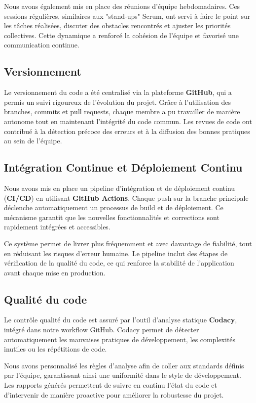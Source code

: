 \documentclass[a4paper,12pt]{article}
\begin{document}
Nous avons également mis en place des réunions d’équipe hebdomadaires. Ces sessions régulières, similaires aux "stand-ups" Scrum, ont servi à faire le point sur les tâches réalisées, discuter des obstacles rencontrés et ajuster les priorités collectives. Cette dynamique a renforcé la cohésion de l’équipe et favorisé une communication continue.

\subsection {Versionnement}

Le versionnement du code a été centralisé via la plateforme \textbf{GitHub}, qui a permis un suivi rigoureux de l’évolution du projet. Grâce à l’utilisation des branches, commits et pull requests, chaque membre a pu travailler de manière autonome tout en maintenant l'intégrité du code commun. Les revues de code ont contribué à la détection précoce des erreurs et à la diffusion des bonnes pratiques au sein de l’équipe.

\subsection{Intégration Continue et Déploiement Continu}

Nous avons mis en place un pipeline d’intégration et de déploiement continu (\textbf{CI/CD}) en utilisant \textbf{GitHub Actions}. Chaque push sur la branche principale déclenche automatiquement un processus de build et de déploiement. Ce mécanisme garantit que les nouvelles fonctionnalités et corrections sont rapidement intégrées et accessibles.

Ce système permet de livrer plus fréquemment et avec davantage de fiabilité, tout en réduisant les risques d’erreur humaine. Le pipeline inclut des étapes de vérification de la qualité du code, ce qui renforce la stabilité de l’application avant chaque mise en production.

\subsection {Qualité du code}

Le contrôle qualité du code est assuré par l’outil d’analyse statique \textbf{Codacy}, intégré dans notre workflow GitHub. Codacy permet de détecter automatiquement les mauvaises pratiques de développement, les complexités inutiles ou les répétitions de code.

Nous avons personnalisé les règles d’analyse afin de coller aux standards définis par l’équipe, garantissant ainsi une uniformité dans le style de développement. Les rapports générés permettent de suivre en continu l’état du code et d’intervenir de manière proactive pour améliorer la robustesse du projet.
\end{document}
